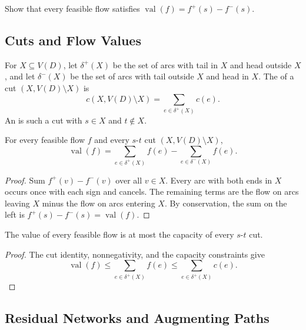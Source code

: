 \begin{Exercise}
Show that every feasible flow satisfies $\operatorname{val}(f) = f^+(s) - f^-(s)$.
\end{Exercise}

\subsection{Cuts and Flow Values}\label{subsec:FlowCuts}

For $X\subseteq V(D)$, let $\delta^+(X)$ be the set of arcs with tail in $X$ and head outside $X$, and let $\delta^-(X)$ be the set of arcs with tail outside $X$ and head in $X$. The  of a cut $(X,V(D)\setminus X)$ is
\begin{equation*}
c(X, V(D) \setminus X) = \sum_{e \in \delta^+(X)} c(e).
\end{equation*}
An  is such a cut with $s \in X$ and $t \notin X$.

\begin{Lemma}\label{lem:FlowCutIdentity}
For every feasible flow $f$ and every $s$-$t$ cut $(X,V(D)\setminus X)$,
\begin{equation*}
\operatorname{val}(f)=\sum_{e \in \delta^+(X)}f(e)-\sum_{e \in \delta^-(X)}f(e).
\end{equation*}
\end{Lemma}

\begin{proof}
Sum $f^+(v)-f^-(v)$ over all $v\in X$. Every arc with both ends in $X$ occurs once with each sign and cancels. The remaining terms are the flow on arcs leaving $X$ minus the flow on arcs entering $X$. By conservation, the sum on the left is $f^+(s)-f^-(s)=\operatorname{val}(f)$.
\end{proof}

\begin{Corollary}\label{cor:FlowBoundCut}
The value of every feasible flow is at most the capacity of every $s$-$t$ cut.
\end{Corollary}

\begin{proof}
The cut identity, nonnegativity, and the capacity constraints give
\begin{equation*}
\operatorname{val}(f) \le \sum_{e \in \delta^+(X)} f(e) \le \sum_{e \in \delta^+(X)}c(e).
\end{equation*}
\end{proof}

\subsection{Residual Networks and Augmenting Paths}\label{subsec:ResidualNetworks}

